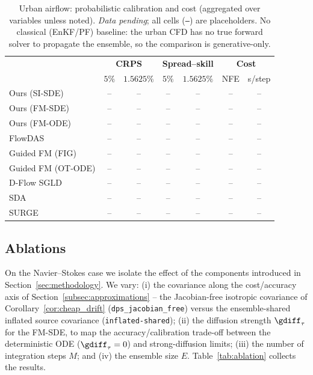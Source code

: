 \begin{table}[ht]
    \centering
    \small
    \caption{Urban airflow: probabilistic calibration and cost (aggregated over variables unless noted). \emph{Data pending}; all cells (\texttt{--}) are placeholders. No classical (EnKF/PF) baseline: the urban CFD has no true forward solver to propagate the ensemble, so the comparison is generative-only.}
    \label{tab:urban_calibration_cost}
    \begin{tabular}{l|cc|cc|cc}
        \toprule
        & \multicolumn{2}{c|}{\textbf{CRPS}}
        & \multicolumn{2}{c|}{\textbf{Spread--skill}}
        & \multicolumn{2}{c}{\textbf{Cost}} \\
        & $5\%$ & $1.5625\%$ & $5\%$ & $1.5625\%$ & NFE & s/step \\
        \midrule
        Ours (SI-SDE) & -- & -- & -- & -- & -- & -- \\
        Ours (FM-SDE) & -- & -- & -- & -- & -- & -- \\
        Ours (FM-ODE) & -- & -- & -- & -- & -- & -- \\
        \midrule
        FlowDAS & -- & -- & -- & -- & -- & -- \\
        Guided FM (FIG) & -- & -- & -- & -- & -- & -- \\
        Guided FM (OT-ODE) & -- & -- & -- & -- & -- & -- \\
        D-Flow SGLD & -- & -- & -- & -- & -- & -- \\
        SDA & -- & -- & -- & -- & -- & -- \\
        SURGE & -- & -- & -- & -- & -- & -- \\
        \bottomrule
    \end{tabular}
\end{table}

\subsection{Ablations}
\label{subsec:results_ablations}
On the Navier--Stokes case we isolate the effect of the components introduced in Section~\ref{sec:methodology}. We vary: (i) the covariance along the cost/accuracy axis of Section~\ref{subsec:approximations} -- the Jacobian-free isotropic covariance of Corollary~\ref{cor:cheap_drift} (\texttt{dps\_jacobian\_free}) versus the ensemble-shared inflated source covariance (\texttt{inflated-shared}); (ii) the diffusion strength $\gdiff_\tau$ for the FM-SDE, to map the accuracy/calibration trade-off between the deterministic ODE ($\gdiff_\tau=0$) and strong-diffusion limits; (iii) the number of integration steps $M$; and (iv) the ensemble size $E$. Table~\ref{tab:ablation} collects the results.

